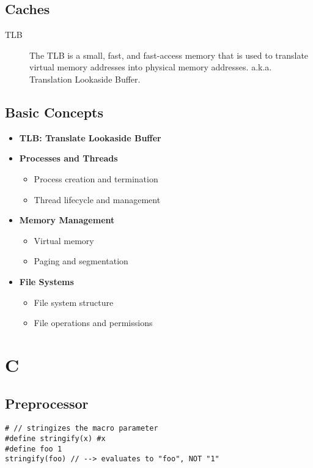 \documentclass{article}
\begin{document}
    \subsection{Caches}
      \begin{description}
        \item[TLB]
          The TLB is a small, fast, and fast-access memory that is used to translate virtual memory addresses into physical memory addresses. a.k.a. Translation Lookaside Buffer.
      \end{description}
    \subsection{Basic Concepts}
      \begin{itemize}
        \item \textbf{TLB: Translate Lookaside Buffer}
        \item \textbf{Processes and Threads}
          \begin{itemize}
            \item Process creation and termination
            \item Thread lifecycle and management
          \end{itemize}
        \item \textbf{Memory Management}
          \begin{itemize}
            \item Virtual memory
            \item Paging and segmentation
          \end{itemize}
        \item \textbf{File Systems}
          \begin{itemize}
            \item File system structure
            \item File operations and permissions
          \end{itemize}
      \end{itemize}


\section{C}
    \subsection{Preprocessor}
      \begin{lstlisting}[style=cpp]
# // stringizes the macro parameter
#define stringify(x) #x
#define foo 1
stringify(foo) // --> evaluates to "foo", NOT "1"
\end{lstlisting}
\end{document}
